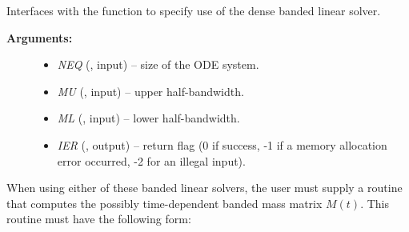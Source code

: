 \documentclass[letterpaper,10pt,english]{sphinxmanual}
\begin{document}
\begin{fulllineitems}
\label{f_interface/Usage:f/_/FARKMASSLAPACKBAND}
Interfaces with the {\hyperref[c_interface/User_callable:c.ARKMassLapackBand]{\emph{}}} function
to specify use of the dense banded linear solver.
\begin{description}
\item[{\textbf{Arguments:}}] \leavevmode\begin{itemize}
\item {} 
\emph{NEQ} (, input) -- size of the ODE system.

\item {} 
\emph{MU} (, input) -- upper half-bandwidth.

\item {} 
\emph{ML} (, input) -- lower half-bandwidth.

\item {} 
\emph{IER} (, output) -- return flag (0 if success, -1 if a memory allocation
error occurred, -2 for an illegal input).

\end{itemize}

\end{description}

\end{fulllineitems}


When using either of these banded linear solvers, the user must supply
a routine that computes the possibly time-dependent banded mass matrix
\(M(t)\).  This routine must have the following form:
\end{document}
